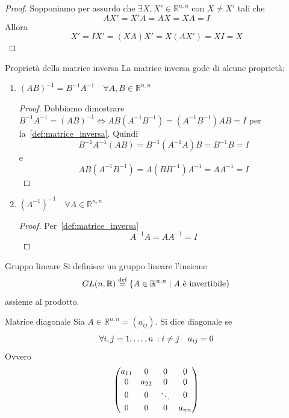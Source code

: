 \begin{proof}
  Sopponiamo per assurdo che $\exists X,X'\in\mathbb{R}^{n,n}$ con $X\neq X'$ tali che
  \begin{equation*}
    AX'=X'A=AX=XA=I
  \end{equation*}
  Allora
  \begin{equation*}
    X'=IX' = (XA)X' = X(AX') = XI = X
  \end{equation*}
\end{proof}

\begin{SubDef}{Proprietà della matrice inversa}
  La matrice inversa gode di alcune proprietà:
  \begin{enumerate}
    \item $(AB)^{-1} = B^{-1}A^{-1}\quad\forall A,B\in\mathbb{R}^{n,n}$
      \begin{proof}
        Dobbiamo dimostrare $B^{-1}A^{-1}={(AB)}^{-1}\iff
          AB(A^{-1}B^{-1})=(A^{-1}B^{-1})AB=I$ per la~\autoref{def:matrice_inversa}.
          Quindi
          \begin{equation*}
            B^{-1}A^{-1}(AB) = B^{-1}(A^{-1}A)B = B^{-1}B = I
          \end{equation*}
          e
          \begin{equation*}
            AB(A^{-1}B^{-1}) = A(BB^{-1})A^{-1} = AA^{-1} = I
          \end{equation*}
      \end{proof}
    \item ${(A^{-1})}^{-1}\quad\forall A\in\mathbb{R}^{n,n}$
      \begin{proof}
        Per~\autoref{def:matrice_inversa}
        \begin{equation*}
          A^{-1}A = AA^{-1} = I
        \end{equation*}
      \end{proof}
  \end{enumerate}
\end{SubDef}

\begin{SubDef}{Gruppo lineare}
  Si definisce un gruppo lineare l'insieme
  \begin{equation*}
    GL(n,\mathbb{R})\bydef \left\{ A\in\mathbb{R}^{n,n}\Setsuchthat A\text{ è
    invertibile} \right\}
  \end{equation*}
  assieme al prodotto.
\end{SubDef}

\begin{Def}{Matrice diagonale}
  Sia $A\in\mathbb{R}^{n,n} = (a_{ij})$. Si dice diagonale se
  \begin{equation*}
    \forall i,j = 1,\ldots,n\,: i\neq j\quad a_{ij} = 0
  \end{equation*}
  Ovvero
  \begin{equation*}
    \mqty(\dmat[0]{a_{11}, a_{22}, \ddots, a_{nn}})
  \end{equation*}
\end{Def}

